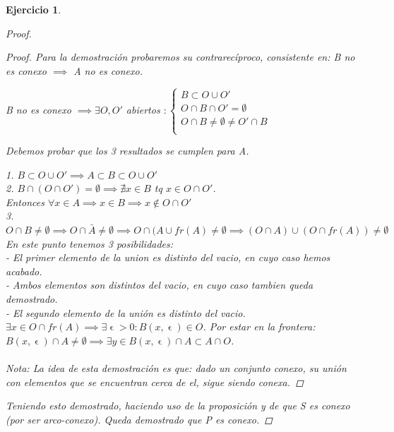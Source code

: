 \documentclass[11pt, a4paper, titlepage]{article}
\let\epsilon\upvarepsilon
\theoremstyle{exercise-style}
\newtheorem*{ejer}{Ejercicio}
\theoremstyle{theorem-style}
\begin{document}
\begin{ejer}
\begin{proof}
\begin{proof}
 Para la demostración probaremos su contrarecíproco, consistente en: B no es conexo $\implies$ A no es conexo.
 
B no es conexo $\implies \exists O,O'$ abiertos $: \begin{cases}
B \subset O\cup O'\\
O \cap B \cap O' = \emptyset\\
O \cap B \neq \emptyset \neq O' \cap B\\
\end{cases}$
 
 Debemos probar que los 3 resultados se cumplen para A. 
 
 1. $B \subset O \cup O' \implies A \subset B \subset O \cup O'$\\
 2. $B \cap (O\cap O') = \emptyset \implies \nexists x \in B$ tq $x \in O \cap O'$. \\
 Entonces $\forall x \in A \implies x \in B \implies x \not\in O \cap O'$\\
 3. $O \cap B \neq \emptyset \implies O\cap \bar{A} \neq \emptyset \implies O\cap (A\cup fr(A) \neq \emptyset \implies (O\cap A)\cup (O\cap fr(A)) \neq \emptyset$
 En este punto tenemos 3 posibilidades:\\
  - El primer elemento de la union es distinto del vacio, en cuyo caso hemos acabado.\\
  - Ambos elementos son distintos del vacio, en cuyo caso tambien queda demostrado.\\
  - El segundo elemento de la unión es distinto del vacio. $\exists x \in O\cap fr(A) \implies \exists \epsilon > 0 : B(x,\epsilon) \in O$. Por estar en la frontera: $B(x,\epsilon)\cap A \neq \emptyset \implies \exists y \in B(x,\epsilon)\cap A \subset A \cap O$.\\\\
  
  Nota: La idea de esta demostración es que: dado un conjunto conexo, su unión con elementos que se encuentran cerca de el, sigue siendo conexa.
  
\end{proof}

Teniendo esto demostrado, haciendo uso de la proposición y de que S es conexo (por ser arco-conexo). Queda demostrado que P es conexo.

\end{proof}

\end{ejer}
\end{document}
